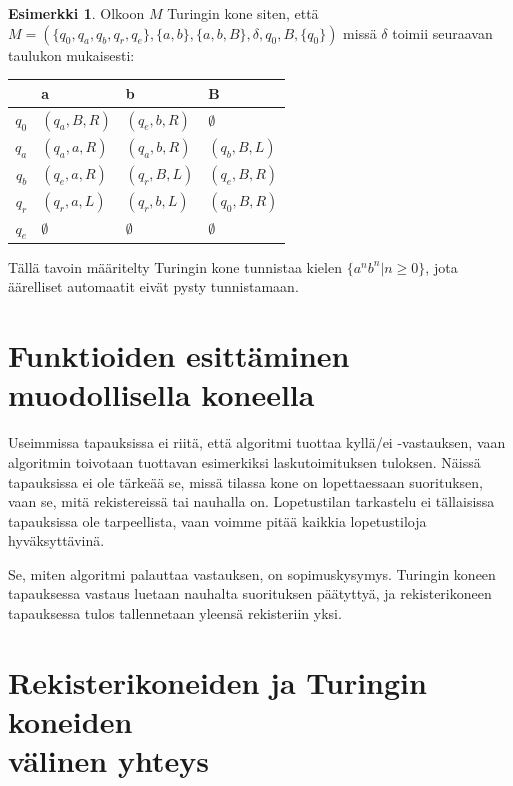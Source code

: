 \documentclass[a4paper, 12pt]{article}
\theoremstyle{definition}
\newtheorem{example}[mydef]{Esimerkki}
\theoremstyle{plain}
\begin{document}
\begin{example}
\label{ex:anbn}
Olkoon $M$ Turingin kone siten, että\\$M = (\{q_0, q_a, q_b, q_r, q_e\}, \{a, b\}, \{a, b, B\}, \delta, q_0, B, \{q_0\})$ missä $\delta$ toimii seuraavan taulukon mukaisesti:

\begin{tabular}{r | l l l}
& a & b & B \\
\hline
$q_0$ & $(q_a, B, R)$ & $(q_e, b, R)$ & $\emptyset$ \\
$q_a$ & $(q_a, a, R)$ & $(q_a, b, R)$ & $(q_b, B, L)$ \\
$q_b$ & $(q_e, a, R)$ & $(q_r, B, L)$ & $(q_e, B, R)$\\
$q_r$ & $(q_r, a, L)$ & $(q_r, b, L)$ & $(q_0, B, R)$\\
$q_e$ & $\emptyset$ & $\emptyset$ & $\emptyset$ \\ 
\end{tabular}

Tällä tavoin määritelty Turingin kone tunnistaa kielen $\{a^nb^n | n \geq 0\}$, jota äärelliset automaatit eivät pysty tunnistamaan.

\end{example}

\section{Funktioiden esittäminen muodollisella koneella}

Useimmissa tapauksissa ei riitä, että algoritmi tuottaa kyllä/ei -vastauksen, vaan algoritmin toivotaan tuottavan esimerkiksi laskutoimituksen tuloksen. Näissä tapauksissa ei ole tärkeää se, missä tilassa kone on lopettaessaan suorituksen, vaan se, mitä rekistereissä tai nauhalla on. Lopetustilan tarkastelu ei tällaisissa tapauksissa ole tarpeellista, vaan voimme pitää kaikkia lopetustiloja hyväksyttävinä.

Se, miten algoritmi palauttaa vastauksen, on sopimuskysymys. Turingin koneen tapauksessa vastaus luetaan nauhalta suorituksen päätyttyä, ja rekisterikoneen tapauksessa tulos tallennetaan yleensä rekisteriin yksi.

\section{Rekisterikoneiden ja Turingin koneiden\\ välinen yhteys}
\end{document}
